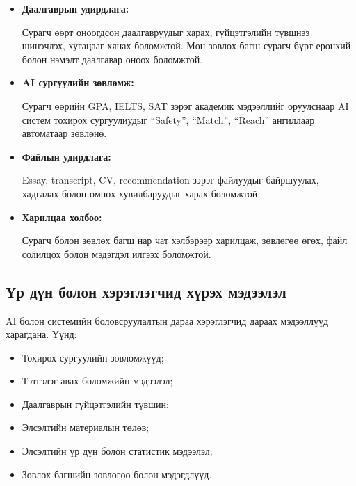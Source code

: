 \begin{itemize}

\item \textbf{Даалгаврын удирдлага:}

Сурагч өөрт оноогдсон даалгавруудыг харах, гүйцэтгэлийн
түвшнээ шинэчлэх, хугацааг хянах боломжтой. Мөн зөвлөх
багш сурагч бүрт ерөнхий болон нэмэлт даалгавар оноох
боломжтой.

\item \textbf{AI сургуулийн зөвлөмж:}

Сурагч өөрийн GPA, IELTS, SAT зэрэг академик мэдээллийг
оруулснаар AI систем тохирох сургуулиудыг ``Safety'',
``Match'', ``Reach'' ангиллаар автоматаар зөвлөнө.

\item \textbf{Файлын удирдлага:}

Essay, transcript, CV, recommendation зэрэг файлуудыг
байршуулах, хадгалах болон өмнөх хувилбаруудыг харах
боломжтой.

\item \textbf{Харилцаа холбоо:}

Сурагч болон зөвлөх багш нар чат хэлбэрээр харилцаж,
зөвлөгөө өгөх, файл солилцох болон мэдэгдэл илгээх
боломжтой.

\end{itemize}

\subsection*{Үр дүн болон хэрэглэгчид хүрэх мэдээлэл}

AI болон системийн боловсруулалтын дараа хэрэглэгчид дараах
мэдээллүүд харагдана. Үүнд:

\begin{itemize}

    \item Тохирох сургуулийн зөвлөмжүүд;
    
    \item Тэтгэлэг авах боломжийн мэдээлэл;
    
    \item Даалгаврын гүйцэтгэлийн түвшин;
    
    \item Элсэлтийн материалын төлөв;
    
    \item Элсэлтийн үр дүн болон статистик мэдээлэл;
    
    \item Зөвлөх багшийн зөвлөгөө болон мэдэгдлүүд.
    
\end{itemize}

